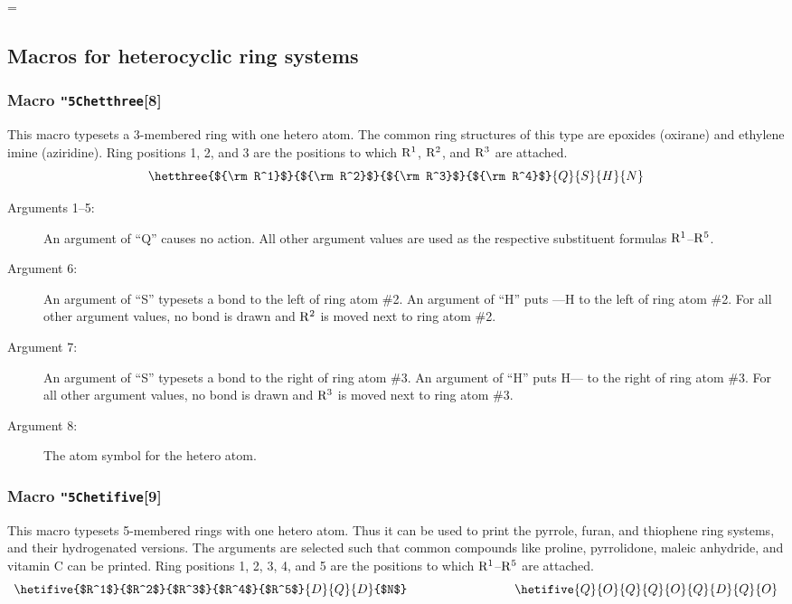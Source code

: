   =\tenrm
  \initial
 \newcommand{\rii}{All other argument values cause no action}
 \newcommand{\rhq}{An argument of ``Q'' causes no action. \ }
 
\subsection{Macros for heterocyclic ring systems}
\subsubsection{Macro {\tt\char"5C{}hetthree}[8]}
  This macro typesets a 3-membered ring with one hetero atom.
 The common ring structures of this type are epoxides (oxirane)
 and ethylene imine (aziridine). Ring positions 1, 2, and 3 are
 the positions to which ${\rm R^1}$, ${\rm R^2}$, and ${\rm R^3}$
 are attached.
 \[ \hetthree{${\rm R^1}$}{${\rm R^2}$}{${\rm R^3}$}{${\rm R^4}$}
               {Q}{S}{H}{N}  \]
 
 \begin{description}
 \item[{\rm Arguments 1--5:}] An argument of ``Q''
      causes no action. All other argument values are used as
      the respective substituent formulas ${\rm R^1}$--${\rm R^5}$.
 \item[{\rm Argument 6:}] An argument of ``S'' typesets
      a bond to the left of ring atom \#2. An argument of ``H''
      puts ---H to the left of ring atom \#2. For all other
      argument values, no bond is drawn and ${\rm R^2}$ is moved
      next to ring atom \#2.
 \item[{\rm Argument 7:}] An argument of ``S'' typesets
      a bond to the right of ring atom \#3. An argument of ``H''
      puts H--- to the right of ring atom \#3. For all other
      argument values, no bond is drawn and ${\rm R^3}$ is
      moved next to ring atom \#3.
 \item[{\rm Argument 8:}] The atom symbol for the
      hetero atom.
 \end{description}
 
\subsubsection{Macro {\tt\char"5C{}hetifive}[9]}
  This macro typesets 5-membered rings with one hetero atom.
 Thus it can be used to print the pyrrole, furan, and
 thiophene ring systems, and their hydrogenated versions.
 The arguments are selected such that common compounds like
 proline, pyrrolidone, maleic anhydride, and vitamin C
 can be printed. Ring positions 1, 2, 3, 4, and 5 are the
 positions to which ${\rm R^1}$--${\rm R^5}$ are attached.
 \[ \hetifive{$R^1$}{$R^2$}{$R^3$}{$R^4$}{$R^5$}{D}{Q}{D}{$N$}
    \hspace{3cm}
    \hetifive{Q}{O}{Q}{Q}{O}{Q}{D}{Q}{O}  \]
 
